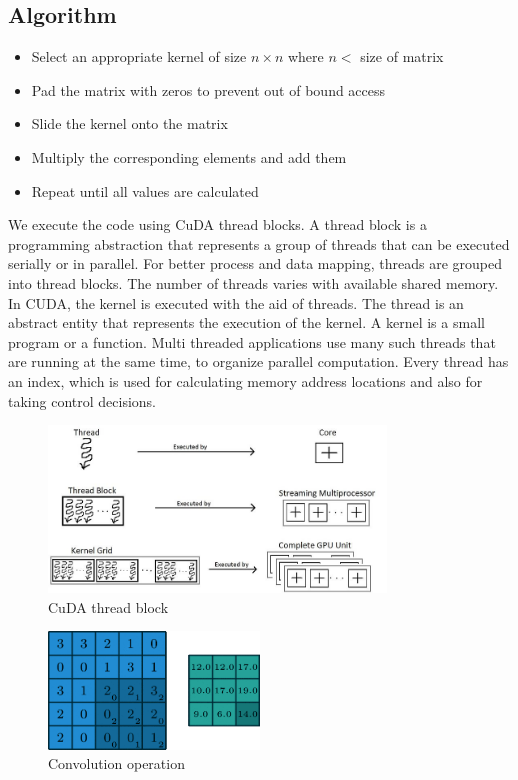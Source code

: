 \documentclass[12pt, letterpaper]{article}
\begin{document}
\subsection{Algorithm}
\begin{itemize}
\item Select an appropriate kernel of size $n\times n$ where $n <$ size of matrix
\item Pad the matrix with zeros to prevent out of bound access
\item Slide the kernel onto the matrix 
\item Multiply the corresponding elements and add them
\item Repeat until all values are calculated 
\end{itemize}

\hspace*{0.25 in}We execute the code using CuDA thread blocks. A thread block is a programming abstraction that represents a group of threads that can be executed serially or in parallel. For better process and data mapping, threads are grouped into thread blocks. The number of threads varies with available shared memory. In CUDA, the kernel is executed with the aid of threads. The thread is an abstract entity that represents the execution of the kernel. A kernel is a small program or a function. Multi threaded applications use many such threads that are running at the same time, to organize parallel computation. Every thread has an index, which is used for calculating memory address locations and also for taking control decisions.

\begin{figure}[H]
	\begin{center}
		\includegraphics[width=0.8\textwidth]{cuda_kernel.jpg}
	\caption{CuDA thread block}
	\end{center}
\end{figure}

\begin{figure}[H]
	\begin{center}
		\includegraphics[width=0.5\textwidth]{convolutional_operation-8.png}
	\caption{Convolution operation}
	\end{center}
\end{figure}
\end{document}
